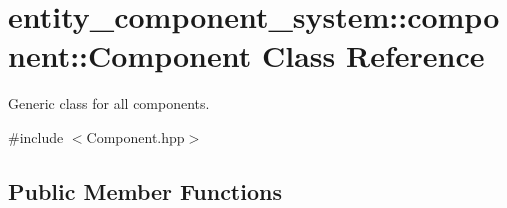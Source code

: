 \section{entity\+\_\+component\+\_\+system\+:\+:component\+:\+:Component Class Reference}
\label{classentity__component__system_1_1component_1_1_component}


Generic class for all components.  




{\ttfamily \#include $<$Component.\+hpp$>$}

\subsection*{Public Member Functions}
